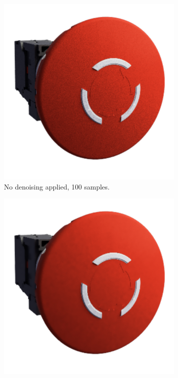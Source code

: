 \begin{figure}[H]
    \centering
    \hspace*{2cm}
    \begin{subfigure}[t]{0.4\textwidth}
        \includegraphics[width=\textwidth]{resources/denoise-off-100-samples.png}
        \caption{No denoising applied, 100 samples.}
        \label{fig:denoise-off}
    \end{subfigure}
    \hfill
    \begin{subfigure}[t]{0.4\textwidth}
        \includegraphics[width=\textwidth]{resources/denoise-gaussian-100-samples.png}

\end{subfigure}
\end{figure}
